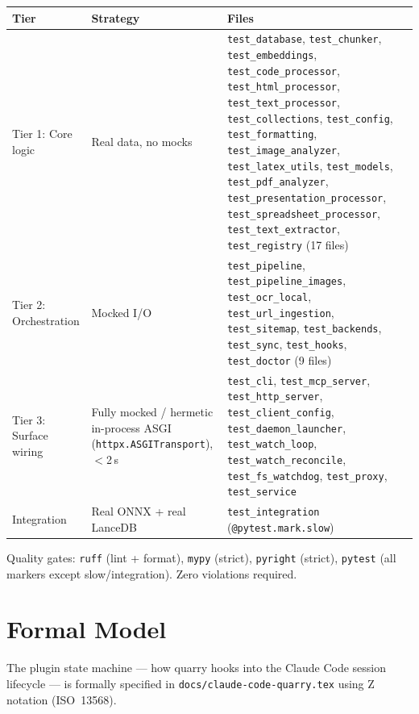 \documentclass[a4paper,10pt]{article}
\begin{document}
\begin{center}
\begin{tabular}{lp{5cm}p{5cm}}
\toprule
\textbf{Tier} & \textbf{Strategy} & \textbf{Files} \\
\midrule
Tier 1: Core logic & Real data, no mocks & \texttt{test\_database},
  \texttt{test\_chunker}, \texttt{test\_embeddings},
  \texttt{test\_code\_processor}, \texttt{test\_html\_processor},
  \texttt{test\_text\_processor}, \texttt{test\_collections},
  \texttt{test\_config}, \texttt{test\_formatting},
  \texttt{test\_image\_analyzer}, \texttt{test\_latex\_utils},
  \texttt{test\_models}, \texttt{test\_pdf\_analyzer},
  \texttt{test\_presentation\_processor},
  \texttt{test\_spreadsheet\_processor},
  \texttt{test\_text\_extractor},
  \texttt{test\_registry} (17 files) \\
Tier 2: Orchestration & Mocked I/O & \texttt{test\_pipeline},
  \texttt{test\_pipeline\_images},
  \texttt{test\_ocr\_local}, \texttt{test\_url\_ingestion},
  \texttt{test\_sitemap}, \texttt{test\_backends},
  \texttt{test\_sync},
  \texttt{test\_hooks}, \texttt{test\_doctor} (9 files) \\
Tier 3: Surface wiring & Fully mocked / hermetic in-process ASGI
  (\texttt{httpx.ASGITransport}), $<$2\,s &
  \texttt{test\_cli}, \texttt{test\_mcp\_server},
  \texttt{test\_http\_server}, \texttt{test\_client\_config},
  \texttt{test\_daemon\_launcher}, \texttt{test\_watch\_loop},
  \texttt{test\_watch\_reconcile}, \texttt{test\_fs\_watchdog},
  \texttt{test\_proxy}, \texttt{test\_service} \\
Integration & Real ONNX + real LanceDB &
  \texttt{test\_integration} (\texttt{@pytest.mark.slow}) \\
\bottomrule
\end{tabular}
\end{center}

Quality gates: \texttt{ruff} (lint + format), \texttt{mypy} (strict),
\texttt{pyright} (strict), \texttt{pytest} (all markers except
slow/integration).  Zero violations required.

\section{Formal Model}

The plugin state machine --- how quarry hooks into the Claude Code
session lifecycle --- is formally specified in
\texttt{docs/claude-code-quarry.tex} using Z notation (ISO~13568).
\end{document}
